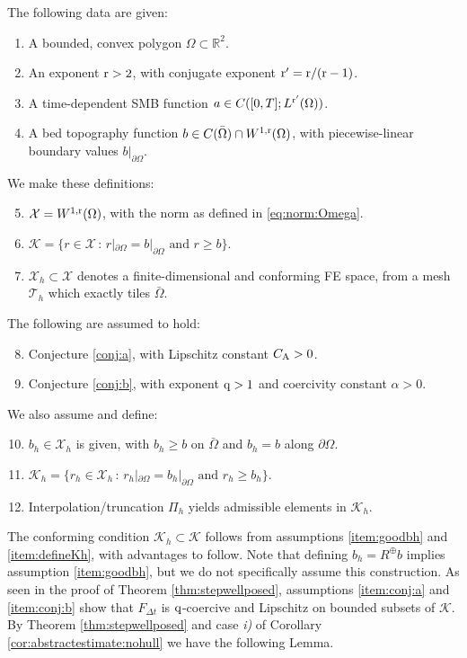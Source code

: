 \documentclass[hidelinks,onefignum,onetabnum,final]{siamart220329}  %
\newcommand{\RR}{\mathbb{R}}
\newcommand{\cK}{\mathcal{K}}
\newcommand{\cT}{\mathcal{T}}
\newcommand{\cX}{\mathcal{X}}
\newcommand{\qq}{{\text{\textnormal{q}}}}
\newcommand{\rr}{{\text{\textnormal{r}}}}
\newcommand{\CA}{C_\text{\textnormal{A}}}
\begin{document}
\smallskip
\begin{assumptions}
The following data are given:
\begin{enumerate}
\item A bounded, convex polygon $\Omega\subset\RR^2$.
\item An exponent $\rr > 2$, with conjugate exponent $\rr' = \rr/(\rr-1)$. \label{item:rr}
\item A time-dependent SMB function $a\in C([0,T]; L^{\rr'}(\Omega))$.
\item A bed topography function $b \in C(\bar\Omega) \cap W^{1,\rr}(\Omega)$, with piecewise-linear boundary values $b|_{\partial\Omega}$.
\end{enumerate}
We make these definitions:
\begin{enumerate}
\setcounter{enumi}{4}
\item $\cX = W^{1,\rr}(\Omega)$, with the norm as defined in \eqref{eq:norm:Omega}.
\item $\cK = \{r\in\cX\,:\,r|_{\partial \Omega} = b|_{\partial \Omega} \text{ and } r \ge b\}$.
\item $\cX_h \subset \cX$ denotes a finite-dimensional and conforming FE space, from a mesh $\cT_h$ which exactly tiles $\bar\Omega$.
\end{enumerate}
The following are assumed to hold:
\begin{enumerate}
\setcounter{enumi}{7}
\item Conjecture \ref{conj:a}, with Lipschitz constant $\CA > 0$. \label{item:conj:a}
\item Conjecture \ref{conj:b}, with exponent $\qq>1$ and coercivity constant $\alpha > 0$.\label{item:conj:b}
\end{enumerate}
We also assume and define:
\begin{enumerate}
\setcounter{enumi}{9}
\item $b_h\in\cX_h$ is given, with $b_h\ge b$ on $\bar\Omega$ and $b_h=b$ along $\partial \Omega$. \label{item:goodbh}
\item $\cK_h = \{r_h\in\cX_h\,:\,r_h|_{\partial \Omega} = b_h|_{\partial \Omega} \text{ and } r_h \ge b_h\}$. \label{item:defineKh}
\item Interpolation/truncation $\Pi_h$ yields admissible elements in $\cK_h$.  \label{item:Pi}
\end{enumerate}
\end{assumptions}

\medskip
The conforming condition $\cK_h\subset \cK$ follows from assumptions \ref{item:goodbh} and \ref{item:defineKh}, with advantages to follow.  Note that defining $b_h=R^{\oplus} b$ implies assumption \ref{item:goodbh}, but we do not specifically assume this construction.  As seen in the proof of Theorem \ref{thm:stepwellposed}, assumptions \ref{item:conj:a} and \ref{item:conj:b} show that $F_{\Delta t}$ is $\qq$-coercive and Lipschitz on bounded subsets of $\cK$.  By Theorem \ref{thm:stepwellposed} and case \emph{i)} of Corollary \ref{cor:abstractestimate:nohull} we have the following Lemma.
\end{document}
